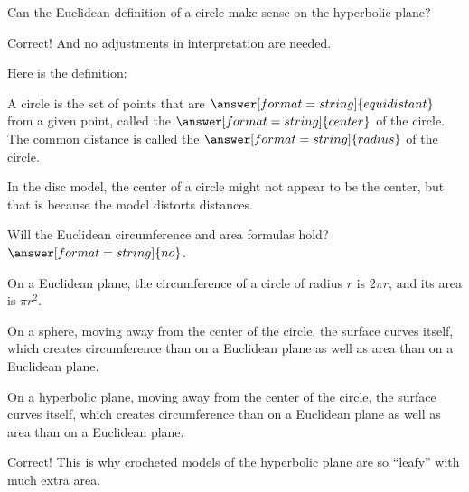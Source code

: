 \documentclass{ximera}
\begin{document}
\begin{problem}
Can the Euclidean definition of a circle make sense on the hyperbolic plane?  
\begin{multipleChoice}
\end{multipleChoice}
\begin{problem}
Correct! And no adjustments in interpretation are needed.

Here is the definition:  

A circle is the set of points that are $\answer[format=string]{equidistant}$ from a given point, called the $\answer[format=string]{center}$ of the circle.  The common distance is called the $\answer[format=string]{radius}$ of the circle.  

In the disc model, the center of a circle might not appear to be the center, but that is because the model distorts distances.  

\begin{problem}
Will the Euclidean circumference and area formulas hold?  
$\answer[format=string]{no}$. 
\begin{problem}
On a Euclidean plane, the circumference of a circle of radius $r$ is $2\pi r$, and its area is $\pi r^2$.  

On a sphere, moving away from the center of the circle, the surface curves  itself, which creates  circumference than on a Euclidean plane as well as  area than on a Euclidean plane.  

On a hyperbolic plane, moving away from the center of the circle, the surface curves  itself, which creates  circumference than on a Euclidean plane as well as  area than on a Euclidean plane.  
\begin{feedback}[correct]
Correct!  This is why crocheted models of the hyperbolic plane are so ``leafy'' with much extra area.  
\end{feedback}

\end{problem}
\end{problem}
\end{problem}
\end{problem}
\end{document}
